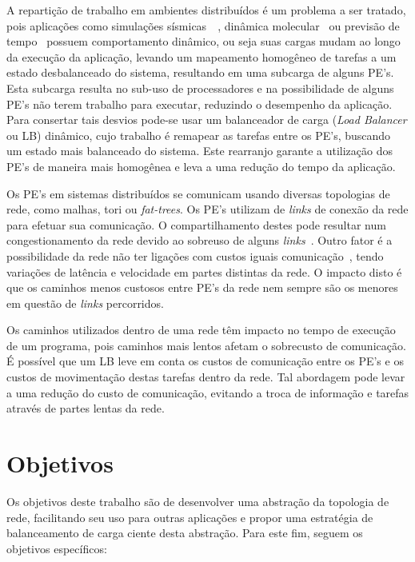 \documentclass[
	12pt,				%
	openright,			%
	twoside,			%
	a4paper,			%
	english,			%
	brazil,				%
	]{abntex2}
\begin{document}
A repartição de trabalho em ambientes distribuídos é um problema a ser tratado, pois aplicações como simulações sísmicas~\cite{dupros}~\cite{tesser}, dinâmica molecular~\cite{bathele-kale} ou previsão de tempo~\cite{rodrigues} possuem comportamento dinâmico, ou seja suas cargas mudam ao longo da execução da aplicação, levando um mapeamento homogêneo de tarefas a um estado desbalanceado do sistema, resultando em uma subcarga de alguns PE’s. Esta subcarga resulta no sub-uso de processadores e na possibilidade de alguns PE's não terem trabalho para executar, reduzindo o desempenho da aplicação. Para consertar tais desvios pode-se usar um balanceador de carga (\textit{Load Balancer} ou LB) dinâmico, cujo trabalho é remapear as tarefas entre os PE’s, buscando um estado mais balanceado do sistema. Este rearranjo garante a utilização dos PE's de maneira mais homogênea e leva a uma redução do tempo da aplicação.

Os PE’s em sistemas distribuídos se comunicam usando diversas topologias de rede, como malhas, tori ou \textit{fat-trees}. Os PE's utilizam de \textit{links} de conexão da rede para efetuar sua comunicação. O compartilhamento destes pode resultar num congestionamento da rede devido ao sobreuso de alguns \textit{links}~\cite{bathele-encyclopedia}. Outro fator é a possibilidade da rede não ter ligações com custos iguais comunicação~\cite{dragonfly}, tendo variações de latência e velocidade em partes distintas da rede. O impacto disto é que os caminhos menos custosos entre PE's da rede nem sempre são os menores em questão de \textit{links} percorridos. 

Os caminhos utilizados dentro de uma rede têm impacto no tempo de execução de um programa, pois caminhos mais lentos afetam o sobrecusto de comunicação. É possível que um LB leve em conta os custos de comunicação entre os PE's e os custos de movimentação destas tarefas dentro da rede. Tal abordagem pode levar a uma redução do custo de comunicação, evitando a troca de informação e tarefas através de partes lentas da rede.

\section{Objetivos}
\label{sec:objetivos}

Os objetivos deste trabalho são de desenvolver uma abstração da topologia de rede, facilitando seu uso para outras aplicações e propor uma estratégia de balanceamento de carga ciente desta abstração. Para este fim, seguem os objetivos específicos:
\end{document}
